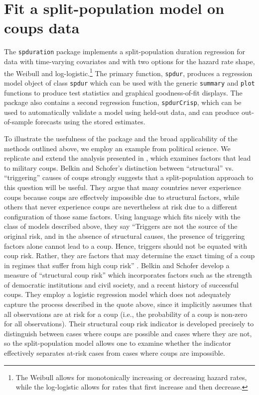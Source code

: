 \documentclass[letter]{article}
\begin{document}
\section{Fit a split-population model on coups data}

The \texttt{spduration} package implements a split-population duration regression for data with time-varying covariates and with two options for the hazard rate shape, the Weibull and log-logistic.\footnote{The Weibull allows for monotonically increasing or decreasing hazard rates, while the log-logistic allows for rates that first increase and then decrease.} The primary function, \texttt{spdur}, produces a regression model object of class \texttt{spdur} which can be used with the generic \texttt{summary} and \texttt{plot} functions to produce test statistics and graphical goodness-of-fit displays. The package also contains a second regression function, \texttt{spdurCrisp}, which can be used to automatically validate a model using held-out data, and can produce out-of-sample forecasts using the stored estimates. 

To illustrate the usefulness of the package and the broad applicability of the methods outlined above, we employ an example from political science. We replicate and extend the analysis presented in \citet{belkin2003toward}, which examines factors that lead to military coups. Belkin and Schofer's distinction between ``structural'' vs. ``triggering'' causes of coups strongly suggests that a split-population approach to this question will be useful. They argue that many countries never experience coups because coups are effectvely impossible due to structural factors, while others that never experience coups are nevertheless at risk due to a different configuration of those same factors. Using language which fits nicely with the class of models described above, they say ``Triggers are not the source of the original risk, and in the absence of structural causes, the presence of triggering factors alone cannot lead to a coup. Hence, triggers should not be equated with coup risk. Rather, they are factors that may determine the exact timing of a coup in regimes that suffer from high coup risk'' \citep[p.\ 598][] {belkin2003toward}. Belkin and Schofer develop a measure of ``structural coup risk'' which incorporates factors such as the strength of democratic institutions and civil society, and a recent history of successful coups. They employ a logistic regression model which does not adequately capture the process described in the quote above, since it implicitly assumes that all observations are at risk for a coup (i.e., the probability of a coup is non-zero for all observations). Their structural coup risk indicator is developed precisely to distinguish between cases where coups are possible and cases where they are not, so the split-population model allows one to examine whether the indicator effectively separates at-risk cases from cases where coups are impossible. 
\end{document}
